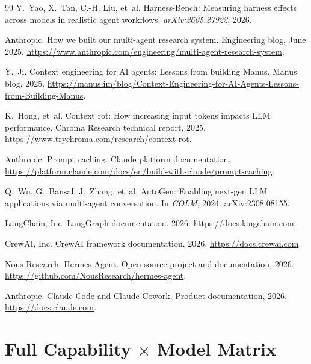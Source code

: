 \documentclass[11pt]{article}
\begin{document}
\begin{thebibliography}{99}
 Y.~Yao, X.~Tan, C.-H. Liu, et~al. Harness-Bench: Measuring harness effects across models in realistic agent workflows. \emph{arXiv:2605.27922}, 2026.

 Anthropic. How we built our multi-agent research system. Engineering blog, June 2025. \url{https://www.anthropic.com/engineering/multi-agent-research-system}.

 Y.~Ji. Context engineering for AI agents: Lessons from building Manus. Manus blog, 2025. \url{https://manus.im/blog/Context-Engineering-for-AI-Agents-Lessons-from-Building-Manus}.

 K.~Hong, et~al. Context rot: How increasing input tokens impacts LLM performance. Chroma Research technical report, 2025. \url{https://www.trychroma.com/research/context-rot}.

 Anthropic. Prompt caching. Claude platform documentation. \url{https://platform.claude.com/docs/en/build-with-claude/prompt-caching}.

 Q.~Wu, G.~Bansal, J.~Zhang, et~al. AutoGen: Enabling next-gen LLM applications via multi-agent conversation. In \emph{COLM}, 2024. arXiv:2308.08155.

 LangChain, Inc. LangGraph documentation. 2026. \url{https://docs.langchain.com}.

 CrewAI, Inc. CrewAI framework documentation. 2026. \url{https://docs.crewai.com}.

 Nous Research. Hermes Agent. Open-source project and documentation, 2026. \url{https://github.com/NousResearch/hermes-agent}.

 Anthropic. Claude Code and Claude Cowork. Product documentation, 2026. \url{https://docs.claude.com}.

\end{thebibliography}

\clearpage
\appendix

\section{Full Capability $\times$ Model Matrix}
\label{app:matrix}
\end{document}
